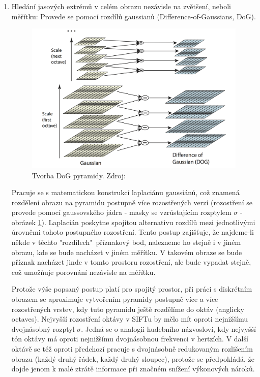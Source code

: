 	\begin{enumerate}
		\item Hledání jasových extrémů v celém obrazu nezávisle na zvětšení, neboli měřítku: Provede se pomocí rozdílů gaussianů (Difference-of-Gaussians, DoG).
		
			\begin{figure}[!ht] 
				\centering
					\includegraphics[width=5in]{img/DOG.png}
				\caption{Tvorba DoG pyramidy. Zdroj: \cite{lowe2004distinctive}} 	\label{sift_dog}
			\end{figure} 
			
			Pracuje se s matematickou konstrukcí laplaciánu gaussiánů, což znamená rozdělení obrazu na pyramidu postupně více rozostřených verzí (rozostření se provede pomocí gaussovského jádra - masky se vzrůstajícím rozptylem $\sigma{}$ - obrázek \ref{sift_dog}). Laplacián poskytne spojitou alternativu rozdílů mezi jednotlivými úrovněmi tohoto postupného rozostření. Tento postup zajišťuje, že najdeme-li někde v těchto "rozdílech"\ příznakový bod, nalezneme ho stejně i v jiném obrazu, kde se bude nacházet v jiném měřítku. V takovém obraze se bude příznak nacházet jinde v tomto prostoru rozostření, ale bude vypadat stejně, což umožňuje porovnání nezávisle na měřítku.
			
			Protože výše popsaný postup platí pro spojitý prostor, při práci s diskrétním obrazem se aproximuje vytvořením pyramidy postupně více a více rozostřených vrstev, kdy tuto pyramidu ještě rozdělíme do oktáv (anglicky octaves). Nejvyšší rozostření oktávy v SIFTu by mělo mít oproti nejnižšímu dvojnásobný rozptyl $\sigma$. Jedná se o analogii hudebního názvosloví, kdy nejvyšší tón oktávy má oproti nejnižšímu dvojnásobnou frekvenci v hertzích. V další oktávě se též oproti předchozí pracuje s dvojnásobně redukovaným rozlišením obrazu (každý druhý řádek, každý druhý sloupec), protože se předpokládá, že dojde jenom k malé ztrátě informace při značném snížení výkonových nároků.
			

\end{enumerate}
